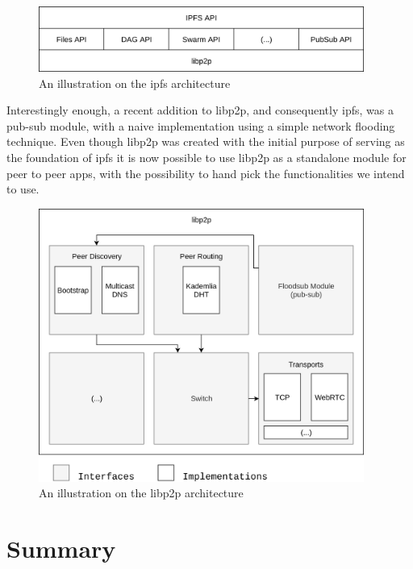 \begin{figure}[hb!]
  \centering
  \includegraphics[width=0.95\textwidth]{img/ipfs-stack.png}
  \caption{An illustration on the \acrshort{ipfs} architecture}
  \label{fig:ipfs-stack}
\end{figure}

Interestingly enough, a recent addition to libp2p, and consequently \acrshort{ipfs}, was a
pub-sub module, with a naive implementation using a simple network flooding
technique. Even though libp2p was created with the initial purpose of serving
as the foundation of \acrshort{ipfs} it is now possible to use libp2p as a standalone
module for peer to peer apps, with the possibility to hand pick the
functionalities we intend to use.

\begin{figure}[hb!]
  \centering
  \includegraphics[width=0.95\textwidth]{img/libp2p-arch.png}
  \caption{An illustration on the libp2p architecture}
  \label{fig:ipfs-arch}
\end{figure}

\section{Summary}\label{summary}

